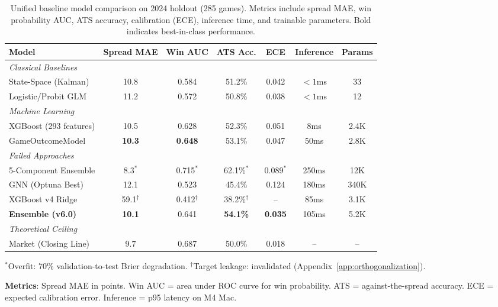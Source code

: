 \begin{table}[htbp]
\centering
\caption[Unified baseline model comparison]{Unified baseline model comparison on 2024 holdout (285 games). Metrics include spread MAE, win probability AUC, ATS accuracy, calibration (ECE), inference time, and trainable parameters. Bold indicates best-in-class performance.}
\label{tab:unified-baseline-summary}
\begin{adjustbox}{max width=\textwidth}
\small
\begin{tabular}{@{}lcccccc@{}}
\toprule
\textbf{Model} & \textbf{Spread MAE} & \textbf{Win AUC} & \textbf{ATS Acc.} & \textbf{ECE} & \textbf{Inference} & \textbf{Params} \\
\midrule
\textit{Classical Baselines} & & & & & & \\
State-Space (Kalman) & 10.8 & 0.584 & 51.2\% & 0.042 & $<1$ms & 33 \\
Logistic/Probit GLM & 11.2 & 0.572 & 50.8\% & 0.038 & $<1$ms & 12 \\
\midrule
\textit{Machine Learning} & & & & & & \\
XGBoost (293 features) & 10.5 & 0.628 & 52.3\% & 0.051 & 8ms & 2.4K \\
GameOutcomeModel & \textbf{10.3} & \textbf{0.648} & 53.1\% & 0.047 & 50ms & 2.8K \\
\midrule
\textit{Failed Approaches} & & & & & & \\
5-Component Ensemble & 8.3$^*$ & 0.715$^*$ & 62.1\%$^*$ & 0.089$^*$ & 250ms & 12K \\
GNN (Optuna Best) & 12.1 & 0.523 & 45.4\% & 0.124 & 180ms & 340K \\
XGBoost v4 Ridge & 59.1$^\dagger$ & 0.412$^\dagger$ & 38.2\%$^\dagger$ & -- & 85ms & 3.1K \\
\midrule
\textbf{Ensemble (v6.0)} & \textbf{10.1} & 0.641 & \textbf{54.1\%} & \textbf{0.035} & 105ms & 5.2K \\
\midrule
\textit{Theoretical Ceiling} & & & & & & \\
Market (Closing Line) & 9.7 & 0.687 & 50.0\% & 0.018 & -- & -- \\
\bottomrule
\end{tabular}
\end{adjustbox}
\begin{tablenotes}
\footnotesize
\item $^*$Overfit: 70\% validation-to-test Brier degradation. $^\dagger$Target leakage: invalidated (Appendix~\ref{app:orthogonalization}).
\item \textbf{Metrics}: Spread MAE in points. Win AUC = area under ROC curve for win probability. ATS = against-the-spread accuracy. ECE = expected calibration error. Inference = p95 latency on M4 Mac.
\end{tablenotes}
\end{table}

